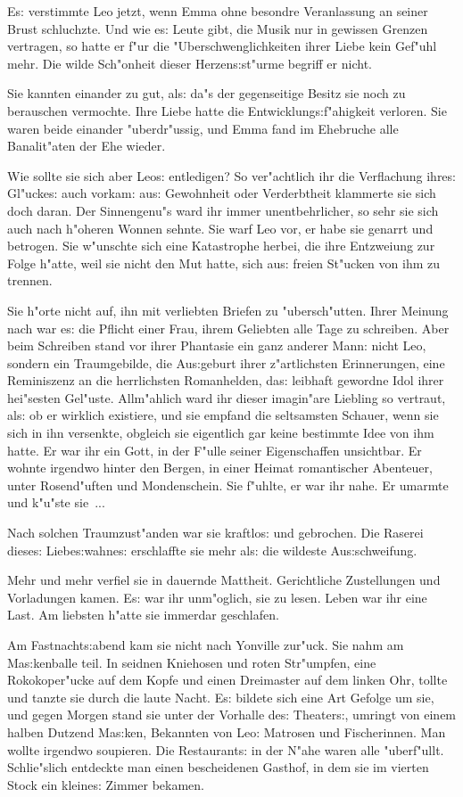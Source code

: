 \documentclass[oneside,12pt]{book}
\newcommand{\s}{s:}%
\begin{document}
E{\s} verstimmte Leo jetzt, wenn Emma ohne besondre Veranlassung
an seiner Brust schluchzte. Und wie e{\s} Leute gibt, die Musik
nur in gewissen Grenzen vertragen, so hatte er f"ur die
"Uberschwenglichkeiten ihrer Liebe kein Gef"uhl mehr. Die wilde
Sch"onheit dieser Herzen{\s}st"urme begriff er nicht.

Sie kannten einander zu gut, al{\s} da"s der gegenseitige Besitz
sie noch zu berauschen vermochte. Ihre Liebe hatte die
Entwicklung{\s}f"ahigkeit verloren. Sie waren beide einander
"uberdr"ussig, und Emma fand im Ehebruche alle Banalit"aten der
Ehe wieder.

Wie sollte sie sich aber Leo{\s} entledigen? So ver"achtlich ihr
die Verflachung ihre{\s} Gl"ucke{\s} auch vorkam: au{\s}
Gewohnheit oder Verderbtheit klammerte sie sich doch daran. Der
Sinnengenu"s ward ihr immer unentbehrlicher, so sehr sie sich auch
nach h"oheren Wonnen sehnte. Sie warf Leo vor, er habe sie genarrt
und betrogen. Sie w"unschte sich eine Katastrophe herbei, die ihre
Ent\/zweiung zur Folge h"atte, weil sie nicht den Mut hatte, sich
au{\s} freien St"ucken von ihm zu trennen.

Sie h"orte nicht auf, ihn mit verliebten Briefen zu
"ubersch"utten. Ihrer Meinung nach war e{\s} die Pflicht einer
Frau, ihrem Geliebten alle Tage zu schreiben. Aber beim Schreiben
stand vor ihrer Phantasie ein ganz anderer Mann: nicht Leo,
sondern ein Traumgebilde, die Au{\s}geburt ihrer z"artlichsten
Erinnerungen, eine Reminis\/zenz an die herrlichsten Romanhelden,
da{\s} leibhaft gewordne Idol ihrer hei"sesten Gel"uste.
Allm"ahlich ward ihr dieser imagin"are Liebling so vertraut,
al{\s} ob er wirklich existiere, und sie empfand die seltsamsten
Schauer, wenn sie sich in ihn versenkte, obgleich sie eigentlich
gar keine bestimmte Idee von ihm hatte. Er war ihr ein Gott, in
der F"ulle seiner Eigenschaffen unsichtbar. Er wohnte irgendwo
hinter den Bergen, in einer Heimat romantischer Abenteuer, unter
Rosend"uften und Mondenschein. Sie f"uhlte, er war ihr nahe. Er
umarmte und k"u"ste sie~...

Nach solchen Traumzust"anden war sie kraftlo{\s} und gebrochen.
Die Raserei diese{\s} Liebe{\s}wahne{\s} erschlaffte sie mehr
al{\s} die wildeste Au{\s}schweifung.

Mehr und mehr verfiel sie in dauernde Mattheit. Gerichtliche
Zustellungen und Vorladungen kamen. E{\s} war ihr unm"oglich, sie
zu lesen. Leben war ihr eine Last. Am liebsten h"atte sie immerdar
geschlafen.

Am Fastnacht{\s}abend kam sie nicht nach Yonville zur"uck. Sie
nahm am Ma{\s}kenballe teil. In seidnen Kniehosen und roten
Str"umpfen, eine Rokokoper"ucke auf dem Kopfe und einen Dreimaster
auf dem linken Ohr, tollte und tanzte sie durch die laute Nacht.
E{\s} bildete sich eine Art Gefolge um sie, und gegen Morgen stand
sie unter der Vorhalle de{\s} Theater{\s}, umringt von einem
halben Dutzend Ma{\s}ken, Bekannten von Leo: Matrosen und
Fischerinnen. Man wollte irgendwo soupieren. Die Restaurant{\s} in
der N"ahe waren alle "uberf"ullt. Schlie"slich entdeckte man einen
bescheidenen Gasthof, in dem sie im vierten Stock ein kleine{\s}
Zimmer bekamen.
\end{document}
